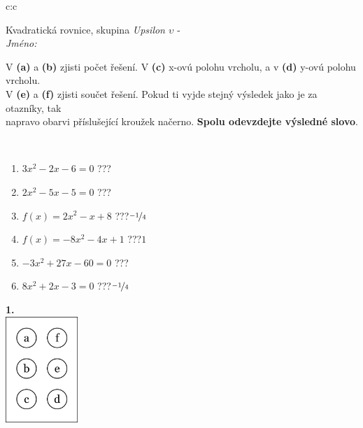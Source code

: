 \documentclass[10pt]{report}
\begin{document}
\begin{tabular}{c:c}
\begin{minipage}[c][104.5mm][t]{0.5\linewidth}
\begin{center}
\vspace{7mm}
{\huge Kvadratická rovnice, skupina \textit{Upsilon $\upsilon$} -}\\[5mm]
\textit{Jméno:}\phantom{xxxxxxxxxxxxxxxxxxxxxxxxxxxxxxxxxxxxxxxxxxxxxxxxxxxxxxxxxxxxxxxxx}\\[5mm]
\begin{minipage}{0.95\linewidth}
\begin{center}
V \textbf{(a)} a \textbf{(b)} zjisti počet řešení. V \textbf{(c)} x-ovú polohu vrcholu, a v \textbf{(d)} y-ovú polohu vrcholu.\\V \textbf{(e)} a \textbf{(f)} zjisti součet řešení. Pokud ti vyjde stejný výsledek jako je za otazníky, tak\\napravo obarvi příslušející kroužek načerno. \textbf{Spolu odevzdejte výsledné slovo}.
\end{center}
\end{minipage}
\\[1mm]
\begin{minipage}{0.79\linewidth}
\begin{center}
\begin{varwidth}{\linewidth}
\begin{enumerate}
\Large
\item $3x^2-2x-6=0$\quad \dotfill\; ???\;\dotfill {}
\item $2x^2-5x-5=0$\quad \dotfill\; ???\;\dotfill {}
\item $f(x)=2x^2-x+8$\quad \dotfill\; ???\;\dotfill \quad $\nicefrac{-1}{4}$
\item $f(x)=-8x^2-4x+1$\quad \dotfill\; ???\;\dotfill \quad $1$
\item $-3x^2+27x-60=0$\quad \dotfill\; ???\;\dotfill {}
\item $8x^2+2x-3=0$\quad \dotfill\; ???\;\dotfill \quad $\nicefrac{-1}{4}$
\end{enumerate}
\end{varwidth}
\end{center}
\end{minipage}
\begin{minipage}{0.20\linewidth}
\begin{center}
{\Huge\bfseries 1.} \\[2mm]
\includegraphics[height=40mm]{../images/braille.png}

\end{center}
\end{minipage}
\end{center}
\end{minipage}
\end{tabular}
\end{document}
